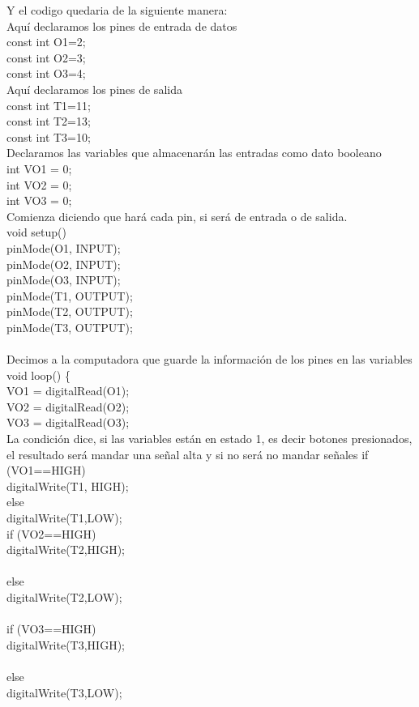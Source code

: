 \documentclass[letterpaper]{article}
\begin{document}
\begin{large}
\begin{enumerate}
        Y el codigo quedaria de la siguiente manera:\\
    Aquí declaramos los pines de entrada de datos\\
const int O1=2; \\
const int O2=3;\\
const int O3=4;\\
Aquí declaramos los pines de salida\\
const int T1=11;\\
const int T2=13;\\
const int T3=10;\\
Declaramos las variables que almacenarán las entradas como dato booleano\\
int VO1 = 0;\\
int VO2 = 0;\\
int VO3 = 0;\\
Comienza diciendo que hará cada pin, si será de entrada o de salida.\\
void setup() {\\
 pinMode(O1, INPUT);\\
 pinMode(O2, INPUT);\\
 pinMode(O3, INPUT);\\
 pinMode(T1, OUTPUT);\\
 pinMode(T2, OUTPUT);\\
 pinMode(T3, OUTPUT);\\
}\\
Decimos a la computadora que guarde la información de los pines en las variables\\
void loop() \{\\
VO1 = digitalRead(O1);\\
VO2 = digitalRead(O2);\\
VO3 = digitalRead(O3);\\

La condición dice, si las variables están en estado 1, es decir botones presionados, el resultado será mandar una señal alta y si no será no mandar señales
if (VO1==HIGH){\\
  digitalWrite(T1, HIGH);\\
}else{\\
  digitalWrite(T1,LOW);\\
if (VO2==HIGH){\\
  digitalWrite(T2,HIGH);\\
}\\
else{\\
  digitalWrite(T2,LOW);\\
}\\
if (VO3==HIGH){\\
  digitalWrite(T3,HIGH);\\
}\\
else{\\
  digitalWrite(T3,LOW);\\
}\\
}
    \end{enumerate}
\end{large}
\end{document}
